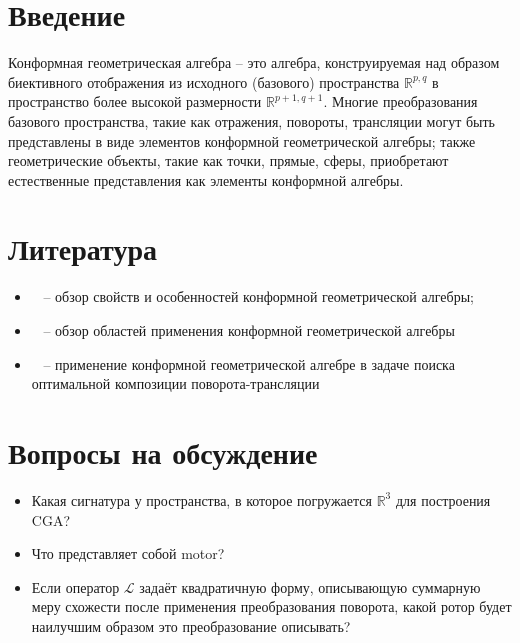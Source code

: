 \section{Введение}

Конформная геометрическая алгебра -- это алгебра, конструируемая над образом биективного отображения из исходного (базового) пространства $\mathds{R}^{p, q}$ в пространство более высокой размерности $\mathds{R}^{p+1, q+1}$. Многие преобразования базового пространства, такие как отражения, повороты, трансляции могут быть представлены в виде элементов конформной геометрической алгебры; также геометрические объекты, такие как точки, прямые, сферы, приобретают естественные представления как элементы конформной алгебры.

\section{Литература}

	\begin{itemize}
		\item ~\cite{Sommer2001} -- обзор свойств и особенностей конформной геометрической алгебры;
		\item ~\cite{Heidelberg2009} -- обзор областей применения конформной геометрической алгебры
		\item ~\cite{Valkenburg2011} -- применение конформной геометрической алгебре в задаче поиска оптимальной композиции поворота-трансляции
	\end{itemize}
	
\section{Вопросы на обсуждение}

	\begin{itemize}
    \item Какая сигнатура у пространства, в которое погружается $\mathds{R}^3$ для построения CGA?
    \item Что представляет собой motor?
    \item Если оператор $\mathcal{L}$ задаёт квадратичную форму, описывающую суммарную меру схожести после применения преобразования поворота, какой ротор будет наилучшим образом это преобразование описывать?
\end{itemize}
